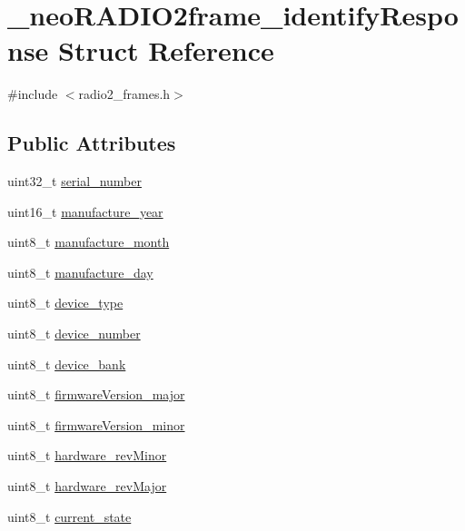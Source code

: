 \hypertarget{struct__neo_r_a_d_i_o2frame__identify_response}{}\section{\+\_\+neo\+R\+A\+D\+I\+O2frame\+\_\+identify\+Response Struct Reference}
\label{struct__neo_r_a_d_i_o2frame__identify_response}


{\ttfamily \#include $<$radio2\+\_\+frames.\+h$>$}

\subsection*{Public Attributes}
\begin{DoxyCompactItemize}
\item 
uint32\+\_\+t \mbox{\hyperlink{struct__neo_r_a_d_i_o2frame__identify_response_a2ad7c614c6e3c7b1ff8b77a56ec20830}{serial\+\_\+number}}
\item 
uint16\+\_\+t \mbox{\hyperlink{struct__neo_r_a_d_i_o2frame__identify_response_a06c4e56767693b2ae0fa72fcb8d1da52}{manufacture\+\_\+year}}
\item 
uint8\+\_\+t \mbox{\hyperlink{struct__neo_r_a_d_i_o2frame__identify_response_a850de5bfb90c47431e325b1f5c4c0786}{manufacture\+\_\+month}}
\item 
uint8\+\_\+t \mbox{\hyperlink{struct__neo_r_a_d_i_o2frame__identify_response_ad209f997565bc5eeb96fe190ab812732}{manufacture\+\_\+day}}
\item 
uint8\+\_\+t \mbox{\hyperlink{struct__neo_r_a_d_i_o2frame__identify_response_ad42fab8713d7291ff139afa3dd4ccd12}{device\+\_\+type}}
\item 
uint8\+\_\+t \mbox{\hyperlink{struct__neo_r_a_d_i_o2frame__identify_response_a0f6f35ac86e52efaf4f230b20714eda2}{device\+\_\+number}}
\item 
uint8\+\_\+t \mbox{\hyperlink{struct__neo_r_a_d_i_o2frame__identify_response_aae45e1576d63910ee91c3c62ff8f224d}{device\+\_\+bank}}
\item 
uint8\+\_\+t \mbox{\hyperlink{struct__neo_r_a_d_i_o2frame__identify_response_a09666e378711c6f0ea7655d2b0d1a740}{firmware\+Version\+\_\+major}}
\item 
uint8\+\_\+t \mbox{\hyperlink{struct__neo_r_a_d_i_o2frame__identify_response_aea2e53b1c1353a172c229ca7c23f4595}{firmware\+Version\+\_\+minor}}
\item 
uint8\+\_\+t \mbox{\hyperlink{struct__neo_r_a_d_i_o2frame__identify_response_af2aa2ca9071e95a1073642de8ec4c77d}{hardware\+\_\+rev\+Minor}}
\item 
uint8\+\_\+t \mbox{\hyperlink{struct__neo_r_a_d_i_o2frame__identify_response_a88296bc11791af9d2b5784422e45b8ea}{hardware\+\_\+rev\+Major}}
\item 
uint8\+\_\+t \mbox{\hyperlink{struct__neo_r_a_d_i_o2frame__identify_response_a3eb1e825550a92aba79fe0691622fa7f}{current\+\_\+state}}
\end{DoxyCompactItemize}


